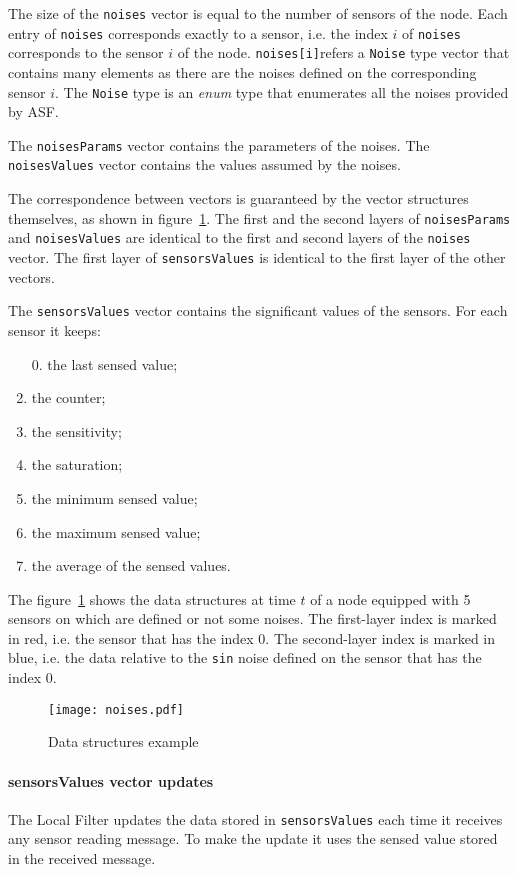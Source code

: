 The size of the \texttt{noises} vector is equal to the number of sensors of the node. Each entry of \texttt{noises} corresponds exactly to a sensor, i.e. the index $i$ of \texttt{noises} corresponds to the sensor $i$ of the node. \texttt{noises[i]}refers a \texttt{Noise} type vector that contains many elements as there are the noises defined on the corresponding sensor $i$. The \texttt{Noise} type is an \emph{enum} type that enumerates all the noises provided by ASF. 

The \texttt{noisesParams} vector contains the parameters of the noises. The \texttt{noisesValues} vector contains the values assumed by the noises. 

The correspondence between vectors is guaranteed by the vector structures themselves, as shown in figure~\ref{img:noises}. The first and the second layers of \texttt{noisesParams} and \texttt{noisesValues} are identical to the first and second layers of the \texttt{noises} vector. The first layer of \texttt{sensorsValues} is identical to the first layer of the other vectors.

The \texttt{sensorsValues} vector contains the significant values of the sensors. For each sensor it keeps:
%
\begin{enumerate}
\item [0.] the last sensed value;
\item the counter;
\item the sensitivity;
\item the saturation;
\item the minimum sensed value;
\item the maximum sensed value;
\item the average of the sensed values.
\end{enumerate}
%

The figure~\ref{img:noises} shows the data structures at time $t$ of a node equipped with 5 sensors on which are defined or not some noises. The first-layer index is marked in red, i.e. the sensor that has the index 0. The second-layer index is marked in blue, i.e. the data relative to the \texttt{sin} noise defined on the sensor that has the index 0.
%
\begin{figure}
\centering
\texttt{[image: noises.pdf]}
\caption{Data structures example}
\label{img:noises}
\end{figure}


\paragraph{sensorsValues vector updates}
The Local Filter updates the data stored in \texttt{sensorsValues} each time it receives any sensor reading message. To make the update it uses the sensed value stored in the received message.

